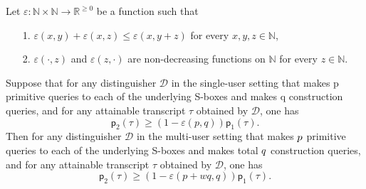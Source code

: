 \begin{lemma}
	\label{lemma:point-wise}
	
	Let $\varepsilon : \mathbb{N} \times \mathbb{N} \rightarrow \mathbb{R}^{\geq 0}$ be a function such that
	\begin{itemize}
		\item[1.] $\varepsilon (x, y) + \varepsilon (x, z) \leq \varepsilon (x, y + z)$ for every $x, y, z \in \mathbb{N}$,
		\item[2.] $\varepsilon (\cdot, z)$ and $\varepsilon (z, \cdot)$ are non-decreasing functions on $\mathbb{N}$ for every $z \in \mathbb{N}$.
	\end{itemize}
	Suppose that for any distinguisher $\mathcal{D}$ in the single-user setting that makes p primitive queries to each of the underlying S-boxes and makes q construction queries, and for any attainable transcript $\tau$ obtained by $\mathcal{D}$, one has
	$$
	\mathsf{p}_{2}\left(\tau\right) \geq (1 - \varepsilon(p,q)) \mathsf{p}_{1}\left(\tau\right).
	$$
	Then for any distinguisher $\mathcal{D}$ in the multi-user setting that makes $\mathnormal{p}$ primitive queries to each of the underlying S-boxes and makes total $\mathnormal{q}$ construction queries, and for any attainable transcript $\tau$ obtained by $\mathcal{D}$, one has
	$$
	\mathsf{p}_{2}\left(\tau\right) \geq (1 - \varepsilon(p + wq,q)) \mathsf{p}_{1}\left(\tau\right).
	$$
\end{lemma}



%
%
%
%
%
%

